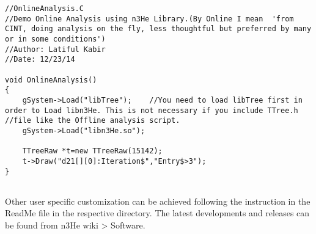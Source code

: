 \documentclass[12pt]{article}
\begin{document}
\begin{lstlisting}
//OnlineAnalysis.C
//Demo Online Analysis using n3He Library.(By Online I mean  'from CINT, doing analysis on the fly, less thoughtful but preferred by many or in some conditions')
//Author: Latiful Kabir
//Date: 12/23/14

void OnlineAnalysis()
{
    gSystem->Load("libTree");    //You need to load libTree first in order to Load libn3He. This is not necessary if you include TTree.h
//file like the Offline analysis script.
    gSystem->Load("libn3He.so");

    TTreeRaw *t=new TTreeRaw(15142);
    t->Draw("d21[][0]:Iteration$","Entry$>3");
}
 
\end{lstlisting}
 

Other user specific customization can be achieved following the instruction in the ReadMe file in the respective directory. The latest developments and releases can be found from n3He wiki > Software.
\end{document}
